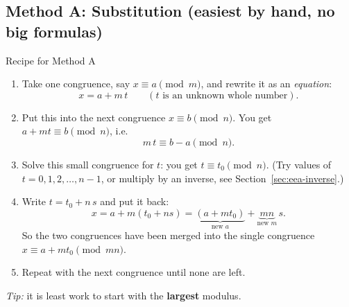 \documentclass[11pt]{article}
\theoremstyle{definition}
\theoremstyle{remark}
\begin{document}
\subsection{Method A: Substitution (easiest by hand, no big formulas)}\label{sec:methodA}

\begin{recipe}{Recipe for Method A}
\begin{enumerate}[leftmargin=1.6em,itemsep=2pt]
\item Take one congruence, say $x\equiv a \pmod m$, and rewrite it as an \emph{equation}:
\[ x = a + m\,t \qquad (t \text{ is an unknown whole number}). \]
\item Put this into the next congruence $x\equiv b\pmod n$. You get $a+mt\equiv b \pmod n$, i.e.\
\[ m\,t\equiv b-a \pmod n. \]
\item Solve this small congruence for $t$: you get $t\equiv t_0\pmod n$. (Try values of $t=0,1,2,\dots,n-1$, or multiply by an inverse, see Section~\ref{sec:eea-inverse}.)
\item Write $t=t_0+n\,s$ and put it back:
\[ x = a+m(t_0+ns) = \underbrace{(a+mt_0)}_{\text{new } a}+\underbrace{mn}_{\text{new } m}\, s. \]
So the two congruences have been merged into the single congruence $x\equiv a+mt_0\pmod{mn}$.
\item Repeat with the next congruence until none are left.
\end{enumerate}
\emph{Tip:} it is least work to start with the \textbf{largest} modulus.
\end{recipe}
\end{document}
